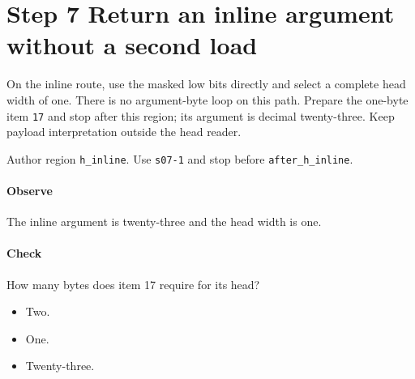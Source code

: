 \section{Step 7 Return an inline argument without a second load}\label{cbor-s07}
On the inline route, use the masked low bits directly and select a complete head width of one. There is no argument-byte loop on this path. Prepare the one-byte item \texttt{17} and stop after this region; its argument is decimal twenty-three. Keep payload interpretation outside the head reader.

Author region \texttt{h\_inline}. Use \texttt{s07-1} and stop before \texttt{after\_h\_inline}.

\paragraph{Observe} The inline argument is twenty-three and the head width is one.

\paragraph{Check} How many bytes does item 17 require for its head?
\begin{itemize}
\item[A.] Two.
\item[B.] One.
\item[C.] Twenty-three.
\end{itemize}
